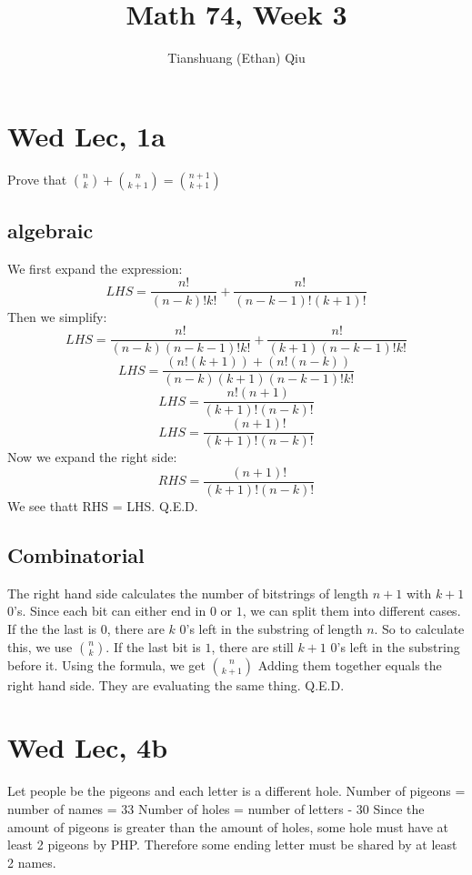 \documentclass[12pt]{article}
\author{Tianshuang (Ethan) Qiu}
\begin{document}
\title{Math 74, Week 3}
\maketitle

\section{Wed Lec, 1a}
Prove that $\binom{n}{k} + \binom{n}{k+1} = \binom{n+1}{k+1}$
\subsection{algebraic}
We first expand the expression:
$$LHS = \frac{n!}{(n-k)!k!} + \frac{n!}{(n-k-1)!(k+1)!}$$
Then we simplify:
$$LHS = \frac{n!}{(n-k)(n-k-1)!k!} + \frac{n!}{(k+1)(n-k-1)!k!}$$
$$LHS = \frac{(n!(k+1))+(n!(n-k))}{(n-k)(k+1)(n-k-1)!k!} $$
$$LHS = \frac{n!(n+1)}{(k+1)!(n-k)!} $$
$$LHS = \frac{(n+1)!}{(k+1)!(n-k)!}$$
Now we expand the right side:
$$RHS = \frac{(n+1)!}{(k+1)!(n-k)!}$$
We see thatt RHS = LHS.
\newline
Q.E.D.

\subsection{Combinatorial}
The right hand side calculates the number of bitstrings of length $n+1$ with $k+1$ 0's. Since each bit can either end in $0$ or $1$, we can split them into different cases.
\newline
If the the last is $0$, there are $k$ 0's left in the substring of length $n$. So to calculate this, we use $\binom{n}{k}$.
\newline
If the last bit is $1$, there are still $k+1$ 0's left in the substring before it. Using the formula, we get $\binom {n}{k+1}$
\newline
Adding them together equals the right hand side. They are evaluating the same thing.
\newline
Q.E.D.

\section{Wed Lec, 4b}
Let people be the pigeons and each letter is a different hole.
\newline
Number of pigeons = number of names = 33
\newline
Number of holes = number of letters - 30
\newline
Since the amount of pigeons is greater than the amount of holes, some hole must have at least 2 pigeons by PHP. Therefore some ending letter must be shared by at least 2 names.
\end{document}

